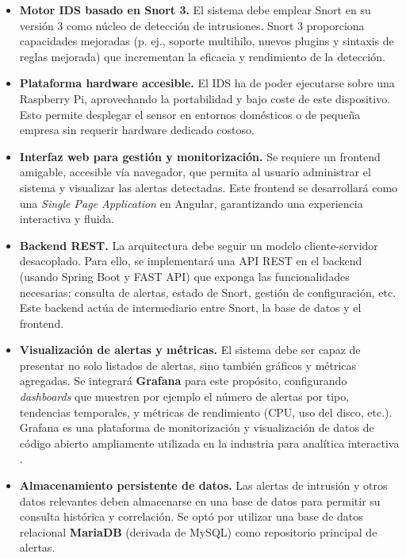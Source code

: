 \documentclass[11pt,a4paper,twoside]{report}
\begin{document}
\begin{itemize}
	\item \textbf{Motor IDS basado en Snort 3.} El sistema debe emplear Snort en su versión 3 como núcleo de detección de intrusiones. Snort 3 proporciona capacidades mejoradas (p. ej., soporte multihilo, nuevos plugins y sintaxis de reglas mejorada) que incrementan la eficacia y rendimiento de la detección.
	
	\item \textbf{Plataforma hardware accesible.} El IDS ha de poder ejecutarse sobre una Raspberry Pi, aprovechando la portabilidad y bajo coste de este dispositivo. Esto permite desplegar el sensor en entornos domésticos o de pequeña empresa sin requerir hardware dedicado costoso.
	
	\item \textbf{Interfaz web para gestión y monitorización.} Se requiere un frontend amigable, accesible vía navegador, que permita al usuario administrar el sistema y visualizar las alertas detectadas. Este frontend se desarrollará como una \emph{Single Page Application} en Angular, garantizando una experiencia interactiva y fluida.
	
	\item \textbf{Backend REST.} La arquitectura debe seguir un modelo cliente-servidor desacoplado. Para ello, se implementará una API REST en el backend (usando Spring Boot y FAST API) que exponga las funcionalidades necesarias: consulta de alertas, estado de Snort, gestión de configuración, etc. Este backend actúa de intermediario entre Snort, la base de datos y el frontend.
	
	\item \textbf{Visualización de alertas y métricas.} El sistema debe ser capaz de presentar no solo listados de alertas, sino también gráficos y métricas agregadas. Se integrará \textbf{Grafana} para este propósito, configurando \emph{dashboards} que muestren por ejemplo el número de alertas por tipo, tendencias temporales, y métricas de rendimiento (CPU, uso del disco, etc.). Grafana es una plataforma de monitorización y visualización de datos de código abierto ampliamente utilizada en la industria para analítica interactiva \cite{Grafana}.
	
	\item \textbf{Almacenamiento persistente de datos.} Las alertas de intrusión y otros datos relevantes deben almacenarse en una base de datos para permitir su consulta histórica y correlación. Se optó por utilizar una base de datos relacional \textbf{MariaDB} (derivada de MySQL) como repositorio principal de alertas.
	

\end{itemize}
\end{document}
